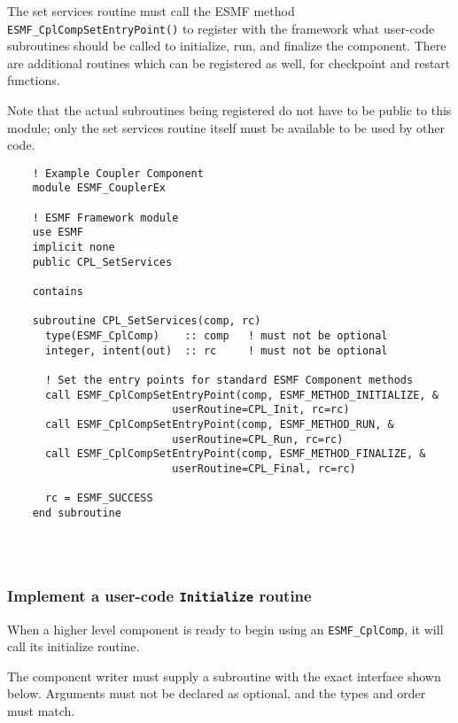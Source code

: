    The set services routine must call the ESMF method 
   {\tt ESMF\_CplCompSetEntryPoint()} to
   register with the framework what user-code subroutines should be called
   to initialize, run, and finalize the component.  There are
   additional routines which can be registered as well, for checkpoint
   and restart functions.
  
   Note that the actual subroutines being registered do not have to be
   public to this module; only the set services routine itself must
   be available to be used by other code. 

 \begin{verbatim}
    ! Example Coupler Component
    module ESMF_CouplerEx
    
    ! ESMF Framework module
    use ESMF
    implicit none
    public CPL_SetServices

    contains

    subroutine CPL_SetServices(comp, rc)
      type(ESMF_CplComp)    :: comp   ! must not be optional
      integer, intent(out)  :: rc     ! must not be optional

      ! Set the entry points for standard ESMF Component methods
      call ESMF_CplCompSetEntryPoint(comp, ESMF_METHOD_INITIALIZE, &
                          userRoutine=CPL_Init, rc=rc)
      call ESMF_CplCompSetEntryPoint(comp, ESMF_METHOD_RUN, &
                          userRoutine=CPL_Run, rc=rc)
      call ESMF_CplCompSetEntryPoint(comp, ESMF_METHOD_FINALIZE, &
                          userRoutine=CPL_Final, rc=rc)

      rc = ESMF_SUCCESS
    end subroutine
 
\end{verbatim}
 
 
\mbox{}\hrulefill\ 
 

  \subsubsection{Implement a user-code {\tt Initialize} routine}
   
   \label{sec:CplInitialize}
  
   When a higher level component is ready to begin using an 
   {\tt ESMF\_CplComp}, it will call its initialize routine.
  
   The component writer must supply a subroutine with the exact interface 
   shown below. Arguments must not be declared as optional, and the types and
   order must match.
  
